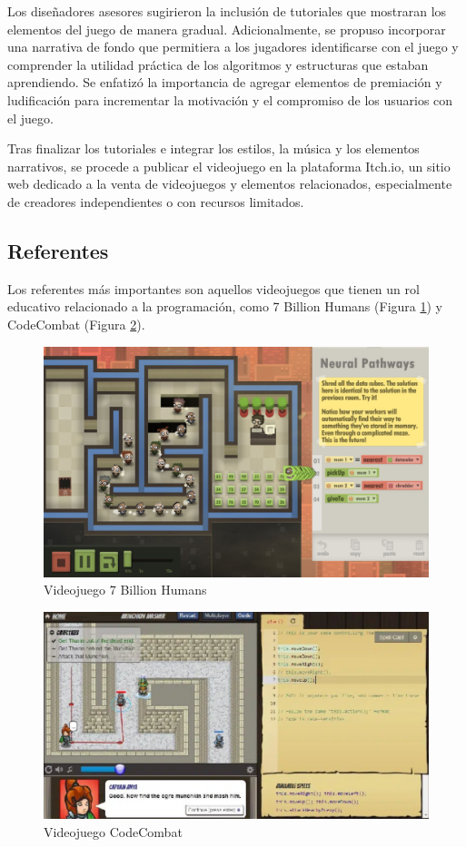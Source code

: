 Los diseñadores asesores sugirieron la inclusión de tutoriales que mostraran los elementos del juego de manera gradual. Adicionalmente, se propuso incorporar una narrativa de fondo que permitiera a los jugadores identificarse con el juego y comprender la utilidad práctica de los algoritmos y estructuras que estaban aprendiendo. Se enfatizó la importancia de agregar elementos de premiación y ludificación para incrementar la motivación y el compromiso de los usuarios con el juego.

Tras finalizar los tutoriales e integrar los estilos, la música y los elementos narrativos, se procede a publicar el videojuego en la plataforma Itch.io, un sitio web dedicado a la venta de videojuegos y elementos relacionados, especialmente de creadores independientes o con recursos limitados.

\subsection{Referentes}

Los referentes más importantes son aquellos videojuegos que tienen un rol educativo relacionado a la programación, como 7 Billion Humans \cite{7billionhumans} (Figura \ref{7BillionHumans}) y CodeCombat \cite{CodeCombat} (Figura \ref{CodeCombat}).

\begin{figure}[h]
	\centering
	\includegraphics[scale=0.3]{imagenes/7BillionHumans.png}
	\caption{Videojuego 7 Billion Humans}
	\label{7BillionHumans}
\end{figure}

\begin{figure}[!h]
	\centering
	\includegraphics[scale=0.3]{imagenes/CodeCombat.png}
	\caption{Videojuego CodeCombat}
	\label{CodeCombat}
\end{figure}

